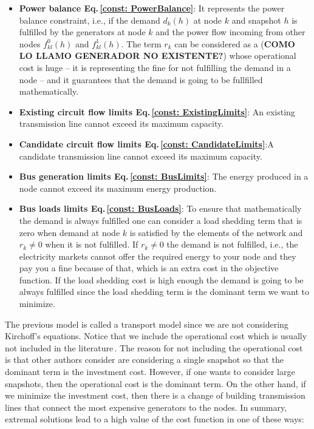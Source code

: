 \begin{itemize}
    \item \textbf{Power balance Eq.\,\eqref{const: PowerBalance}}: It represents the power balance constraint, i.e., if the demand $d_{k}(h)$ at node $k$ and snapshot $h$ is fulfilled by the generators at node $k$ and the power flow incoming from other nodes $f_{kl}^{0}(h)$ and $f_{kl}^{1}(h)$. The term $r_{k}$ can be considered as a (\textbf{COMO LO LLAMO GENERADOR NO EXISTENTE?}) whose operational cost is huge -- it is representing the fine for not fulfilling the demand in a node -- and it guarantees that the demand is going to be fullfilled mathematically. 
    \item \textbf{Existing circuit flow limits Eq.\,\eqref{const: ExistingLimits}}: An existing transmission line cannot exceed its maximum capacity.
    \item \textbf{Candidate circuit flow limits Eq.\,\eqref{const: CandidateLimits}}:A candidate transmission line cannot exceed its maximum capacity.
    \item \textbf{Bus generation limits Eq.\,\eqref{const: BusLimits}}: The energy produced in a node cannot exceed its maximum energy production.
    \item \textbf{Bus loads limits Eq.\,\eqref{const: BusLoads}}: To ensure that mathematically the demand is always fulfilled one can consider a load shedding term that is zero when demand at node $k$ is satisfied by the elements of the network and $r_{k} \neq 0$ when it is not fulfilled. If $r_{k} \neq 0$ the demand is not fulfilled, i.e., the electricity markets cannot offer the required energy to your node and they pay you a fine because of that, which is an extra cost in the objective function. If the load shedding cost is high enough the demand is going to be always fulfilled since the load shedding term is the dominant term we want to minimize.
\end{itemize}
The previous model is called a transport model since we are not considering Kirchoff's equations. Notice that we include the operational cost which is usually not included in the literature\,\cite{Gomes2019}. The reason for not including the operational cost is that other authors consider are considering a single snapshot so that the dominant term is the investment cost. However, if one wants to consider large snapshots, then the operational cost is the dominant term. On the other hand, if we minimize the investment cost, then there is a change of building transmission lines that connect the most expensive generators to the nodes. In summary, extremal solutions lead to a high value of the cost function in one of these ways:
